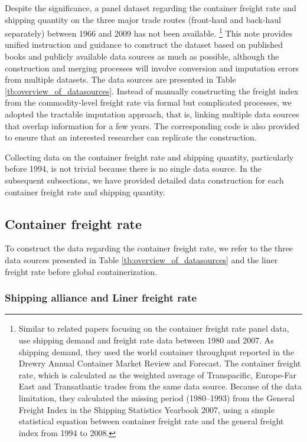 Despite the significance, a panel dataset regarding the container freight rate and shipping quantity on the three major trade routes (front-haul and back-haul separately) between 1966 and 2009 has not been available. \footnote{Similar to related papers focusing on the container freight rate panel data, \cite{luo2009econometric} use shipping demand and freight rate data between 1980 and 2007. As shipping demand, they used the world container throughput reported in the Drewry Annual Container Market Review and Forecast. The container freight rate, which is calculated as the weighted average of Transpacific, Europe-Far East and Transatlantic trades from the same data source. Because of the data limitation, they calculated the missing period (1980–1993) from the General Freight Index in the Shipping Statistics Yearbook 2007, using a simple statistical equation between container freight rate and the general freight index from 1994 to 2008.}  This note provides unified instruction and guidance to construct the dataset based on published books and publicly available data sources as much as possible, although the construction and merging processes will involve conversion and imputation errors from multiple datasets. The data sources are presented in Table \ref{tb:overview_of_datasources}. Instead of manually constructing the freight index from the commodity-level freight rate via formal but complicated processes, we adopted the tractable imputation approach, that is, linking multiple data sources that overlap information for a few years. The corresponding code is also provided to ensure that an interested researcher can replicate the construction. 

Collecting data on the container freight rate and shipping quantity, particularly before 1994, is not trivial because there is no single data source. In the subsequent subsections, we have provided detailed data construction for each container freight rate and shipping quantity.

\subsection{Container freight rate}

To construct the data regarding the container freight rate, we refer to the three data sources presented in Table  \ref{tb:overview_of_datasources} and the liner freight rate before global containerization.

\subsubsection{Shipping alliance and Liner freight rate}\label{subsec:shipping_alliance}


